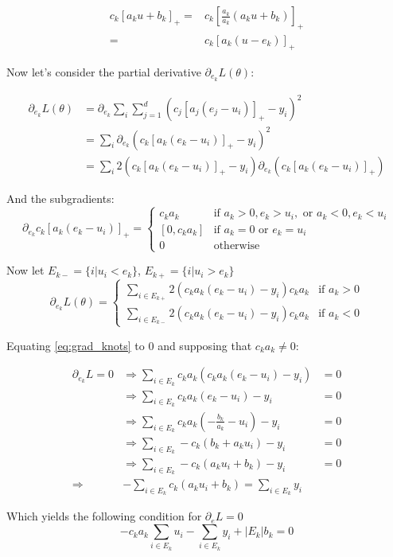 \begin{align}
    c_k[a_k u + b_k]_+ =& c_k[\frac{a_k}{a_k} (a_k u + b_k)]_+ \\
                       =& c_k[a_k(u - e_k)]_+
\end{align}

Now let's consider the partial derivative $\partial_{e_k} L(\theta)$:

\begin{align}
    \partial_{e_k} L(\theta) &= \partial_{e_k} \sum_i \sum_{j=1}^d (c_j [a_j(e_j - u_i)]_+ - y_i)^2 \\
                             &= \sum_i \partial_{e_k} (c_k [a_k(e_k - u_i)]_+ - y_i)^2 \\
                             &= \sum_i 2 (c_k [a_k(e_k - u_i)]_+ - y_i) \partial_{e_k}(c_k[a_k(e_k - u_i)]_+)
\end{align}

And the subgradients:
\begin{equation}
    \partial_{e_k} c_k[a_k(e_k - u_i)]_+ = \begin{cases}
    c_k a_k       & \text{if } a_k > 0, e_k > u_i, \text{ or } a_k < 0, e_k < u_i \\
    [0, c_k a_k]  & \text{if } a_k = 0 \text{ or } e_k = u_i \\
    0             & \text{otherwise}
    \end{cases} 
\end{equation}

Now let $E_{k-} = \{i | u_i < e_k\}$, $E_{k+} = \{i | u_i > e_k\}$ 
\begin{equation} \label{eq:grad_knots}
    \partial_{e_k} L(\theta) = \begin{cases}
                                   \sum_{i \in E_{k+}}  2 (c_k a_k(e_k - u_i) - y_i) c_k a_k & \text{if } a_k > 0 \\
                                   \sum_{i \in E_{k-}}  2 (c_k a_k(e_k - u_i) - y_i) c_k a_k & \text{if } a_k < 0
                               \end{cases}
\end{equation}

Equating \ref{eq:grad_knots} to 0 and supposing that $c_k a_k \neq 0$:

\begin{align}
\partial_{e_k} L = 0 & \Rightarrow \sum_{i \in E_k} c_k a_k (c_k a_k (e_k - u_i) - y_i)    &= 0 \\
                     & \Rightarrow \sum_{i \in E_k} c_k a_k (e_k - u_i) - y_i              &= 0 \\
                     & \Rightarrow \sum_{i \in E_k} c_k a_k (-\frac{b_k}{a_k} - u_i) - y_i &= 0 \\
                     & \Rightarrow \sum_{i \in E_k} -c_k (b_k + a_k u_i) - y_i             &= 0 \\
                     & \Rightarrow \sum_{i \in E_k} -c_k (a_k u_i + b_k) - y_i             &= 0 \\
                     \Rightarrow & -\sum_{i \in E_k} c_k (a_k u_i + b_k) = \sum_{i \in E_k} y_i
\end{align}

Which yields the following condition for $\partial_e L = 0$
\begin{equation}
    -c_k a_k \sum_{i \in E_k} u_i - \sum_{i \in E_k} y_i + |E_k| b_k = 0
\end{equation}